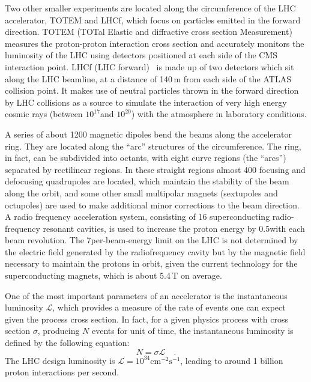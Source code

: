 Two other smaller experiments are located along the circumference of the LHC accelerator, TOTEM and LHCf, which focus on particles emitted in the forward direction. TOTEM (TOTal Elastic and diffractive cross section Measurement)~\cite{Anelli:2008zza} measures the proton-proton interaction cross section and accurately monitors the luminosity of the LHC using detectors positioned at each side of the CMS interaction point. LHCf (LHC forward)~\cite{Adriani:2008zz} is made up of two detectors which sit along the LHC beamline, at a distance of 140\,m from each side of the ATLAS collision point. It makes use of neutral particles thrown in the forward direction by LHC collisions as a source to simulate the interaction of very high energy cosmic rays (between $10^{17}$\TeV and $10^{20}$\TeV) with the atmosphere in laboratory conditions.

A series of about 1200 magnetic dipoles bend the beams along the accelerator ring. They are located along the ``arc'' structures of the circumference. The ring, in fact, can be subdivided into octants, with eight curve regions (the ``arcs'') separated by rectilinear regions. In these straight regions almost 400 focusing and defocusing quadrupoles are located, which maintain the stability of the beam along the orbit, and some other small multipolar magnets (sextupoles and octupoles) are used to make additional minor corrections to the beam direction. A radio frequency acceleration system, consisting of 16 superconducting radio-frequency resonant cavities, is used to increase the proton energy by 0.5\MeV with each beam revolution. The 7\TeV per-beam-energy limit on the LHC is not determined by the electric field generated by the radiofrequency cavity but by the magnetic field necessary to maintain the protons in orbit, given the current technology for the superconducting magnets, which is about 5.4\,T on average.

One of the most important parameters of an accelerator is the instantaneous luminosity $\mathcal{L}$, which provides a measure of the rate of events one can expect given the process cross section. In fact, for a given physics process with cross section $\sigma$, producing $N$ events for unit of time, the instantaneous luminosity is defined by the following equation:
\begin{equation}
N = \sigma\mathcal{L} \quad .
\end{equation}
The LHC design luminosity is $\mathcal{L} = 10^{34} \mathrm{cm^{-2} s^{-1}}$, leading to around 1 billion proton interactions per second.

